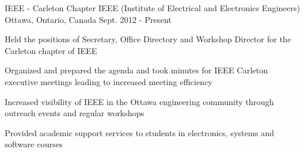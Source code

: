 

\begin{cventries}

  \cventry
    {IEEE - Carleton Chapter} %
    {IEEE (Institute of Electrical and Electronics Engineers)} %
    {Ottawa, Ontario, Canada} %
    {Sept. 2012 - Present} %
    {
      \begin{cvitems} %
        \item {Held the positions of Secretary, Office Directory and Workshop Director for the Carleton chapter of IEEE}
        \item {Organized and prepared the agenda and took minutes for IEEE Carleton executive meetings leading to increased meeting efficiency}
        \item {Increased visibility of IEEE in the Ottawa engineering community through outreach events and regular workshops}
        \item {Provided academic support services to students in electronics, systems and software courses}
      \end{cvitems}
    }

\end{cventries}
